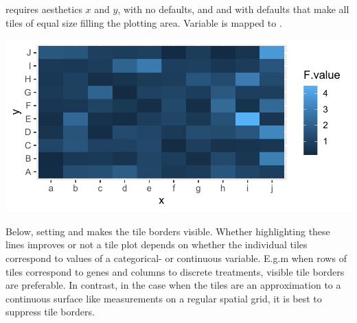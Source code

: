 \documentclass[krantz2]{krantz}\usepackage{knitr}
\begin{document}
\begin{knitrout}\footnotesize
{}\color{fgcolor}\begin{kframe}
\begin{alltt}
\hlstd{(}\hlstd{)}
 \hlkwb{<-} \hlstd{(} \hlstd{=} \hlstd{(}\hlstd{,}  \hlstd{=} \hlstd{,}  \hlstd{=} \hlstd{),}
                          \hlstd{=} \hlstd{(letters[}\hlopt{:}\hlstd{],} \hlstd{),}
                          \hlstd{= LETTERS[}\hlstd{(}\hlopt{:}\hlstd{,} \hlstd{(}\hlstd{,} \hlstd{))])}
\end{alltt}
\end{kframe}
\end{knitrout}

 requires aesthetics $x$ and $y$, with no defaults, and  and  with defaults that make all tiles of equal size filling the plotting area. Variable  is mapped to .

\begin{knitrout}\footnotesize
{}\color{fgcolor}\begin{kframe}
\begin{alltt}
\hlstd{(} 
        \hlstd{=}    \hlopt{+}
  \hlstd{()}
\end{alltt}
\end{kframe}

{\centering \includegraphics[width=.7\textwidth]{figure/pos-tile-plot-02-1} 

}


\end{knitrout}

Below, setting  and  makes the tile borders visible. Whether highlighting these lines improves or not a tile plot depends on whether the individual tiles correspond to values of a categorical- or continuous variable. E.g.m when rows of tiles correspond to genes and columns to discrete treatments, visible tile borders are preferable. In contrast, in the case when the tiles are an approximation to a continuous surface like measurements on a regular spatial grid, it is best to suppress tile borders.
\end{document}
